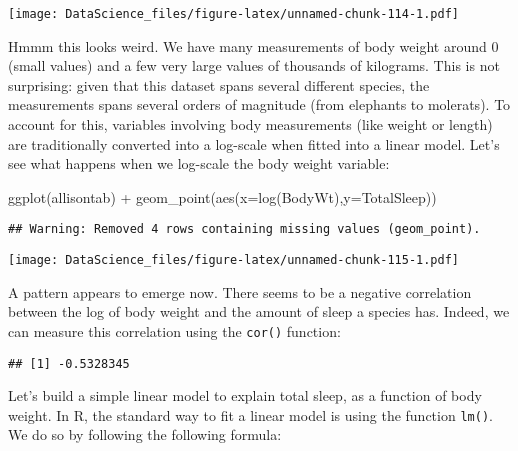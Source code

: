 \documentclass[
]{book}
\newenvironment{Shaded}{\begin{snugshade}}{\end{snugshade}}
\newcommand{\AttributeTok}[1]{\textcolor[rgb]{0.77,0.63,0.00}{#1}}
\newcommand{\FunctionTok}[1]{\textcolor[rgb]{0.00,0.00,0.00}{#1}}
\newcommand{\NormalTok}[1]{#1}
\newcommand{\SpecialCharTok}[1]{\textcolor[rgb]{0.00,0.00,0.00}{#1}}
\newcommand{\StringTok}[1]{\textcolor[rgb]{0.31,0.60,0.02}{#1}}
\begin{document}
\texttt{[image: DataScience\_files/figure-latex/unnamed-chunk-114-1.pdf]}

Hmmm this looks weird. We have many measurements of body weight around 0 (small values) and a few very large values of thousands of kilograms. This is not surprising: given that this dataset spans several different species, the measurements spans several orders of magnitude (from elephants to molerats). To account for this, variables involving body measurements (like weight or length) are traditionally converted into a log-scale when fitted into a linear model. Let's see what happens when we log-scale the body weight variable:

\begin{Shaded}
\begin{Highlighting}[]
\FunctionTok{ggplot}\NormalTok{(allisontab) }\SpecialCharTok{+} \FunctionTok{geom\_point}\NormalTok{(}\FunctionTok{aes}\NormalTok{(}\AttributeTok{x=}\FunctionTok{log}\NormalTok{(BodyWt),}\AttributeTok{y=}\NormalTok{TotalSleep))}
\end{Highlighting}
\end{Shaded}

\begin{verbatim}
## Warning: Removed 4 rows containing missing values (geom_point).
\end{verbatim}

\texttt{[image: DataScience\_files/figure-latex/unnamed-chunk-115-1.pdf]}

A pattern appears to emerge now. There seems to be a negative correlation between the log of body weight and the amount of sleep a species has. Indeed, we can measure this correlation using the \texttt{cor()} function:

\begin{Shaded}
\end{Shaded}

\begin{verbatim}
## [1] -0.5328345
\end{verbatim}

Let's build a simple linear model to explain total sleep, as a function of body weight. In R, the standard way to fit a linear model is using the function \texttt{lm()}. We do so by following the following formula:
\end{document}
